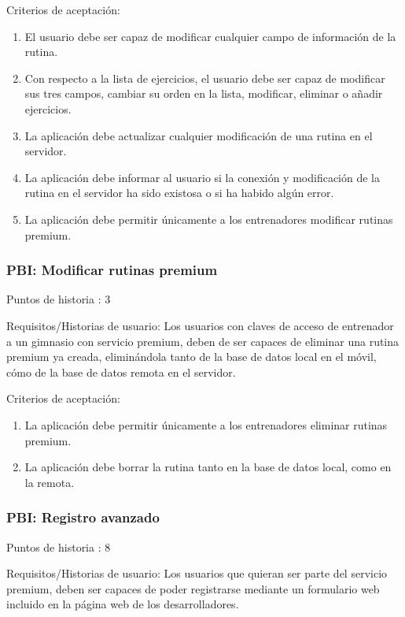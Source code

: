 \documentclass[11pt,a4paper]{report}
\begin{document}
Criterios de aceptación:
\begin{enumerate}
	\item El usuario debe ser capaz de modificar cualquier campo de información de la rutina.

	\item Con respecto a la lista de ejercicios, el usuario debe ser capaz de modificar sus tres campos, cambiar su orden en la lista, modificar, eliminar o añadir ejercicios.

	\item La aplicación debe actualizar cualquier modificación de una rutina en el servidor.

	\item La aplicación debe informar al usuario si la conexión y modificación de la rutina en el servidor ha sido existosa o si ha habido algún error.

	\item La aplicación debe permitir únicamente a los entrenadores modificar rutinas premium.

\end{enumerate}
\subsubsection{PBI: Modificar rutinas premium}
Puntos de historia : 3

Requisitos/Historias de usuario: Los usuarios con claves de acceso de entrenador a un gimnasio con servicio premium, deben de ser capaces de eliminar una rutina premium ya creada, eliminándola tanto de la base de datos local en el móvil, cómo de la base de datos remota en el servidor.

Criterios de aceptación:
\begin{enumerate}
	\item La aplicación debe permitir únicamente a los entrenadores eliminar rutinas premium.

	\item La aplicación debe borrar la rutina tanto en la base de datos local, como en la remota.

\end{enumerate}
\subsubsection{PBI: Registro avanzado}
Puntos de historia : 8

Requisitos/Historias de usuario: Los usuarios que quieran ser parte del servicio premium, deben ser capaces de poder registrarse mediante un formulario web incluido en la página web de los desarrolladores.
\end{document}
